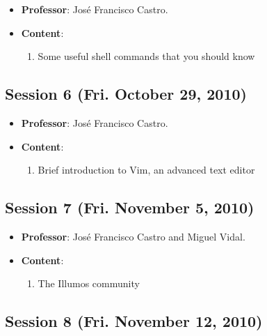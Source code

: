 \documentclass[a4paper]{article}
\begin{document}
\begin{itemize}
 \item \textbf{Professor}: José Francisco Castro.

 \item \textbf{Content}:

 \begin{enumerate}
  \item Some useful shell commands that you should know
 \end{enumerate}

\end{itemize}

\subsection{Session 6 (Fri. October 29, 2010)}

\begin{itemize}
 \item \textbf{Professor}: José Francisco Castro.

 \item \textbf{Content}:

 \begin{enumerate}
  \item Brief introduction to Vim, an advanced text editor
 \end{enumerate}

\end{itemize}

\subsection{Session 7 (Fri. November 5, 2010)}

\begin{itemize}
 \item \textbf{Professor}: José Francisco Castro and Miguel Vidal.

 \item \textbf{Content}:

 \begin{enumerate}
  \item The Illumos community
 \end{enumerate}

\end{itemize}

\subsection{Session 8 (Fri. November 12, 2010)}
\end{document}
